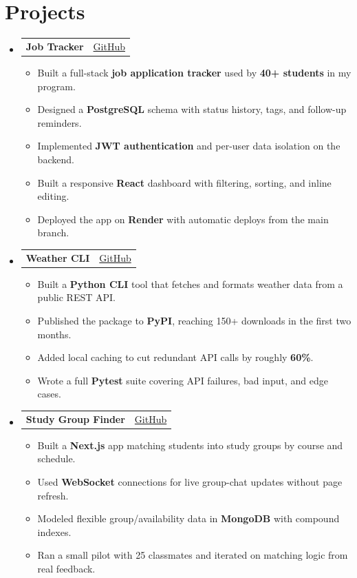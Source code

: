 \documentclass[11pt, a4paper]{article}
\makeatletter
\newcommand{\outerListStart}{%
  \begin{itemize}[
    leftmargin = 0pt,
    label      = {},
    itemsep    = 6pt,
    parsep     = 0pt,
    topsep     = 2pt,
    listparindent = 0pt
  ]%
}
\newcommand{\outerListEnd}{\end{itemize}}
\newcommand{\bulletListStart}{%
  \begin{itemize}[
    leftmargin = 14pt,
    label      = {\small\textbullet},
    itemsep    = 0pt,
    parsep     = 0pt,
    topsep     = 3pt,
    partopsep  = 0pt
  ]%
}
\newcommand{\bulletListEnd}{\end{itemize}}
\newcommand{\bitem}[1]{\item \small #1}
\newcommand{\projectBlockStart}[4]{%
  \item\begin{minipage}[t]{\linewidth}
  \begin{tabularx}{\linewidth}{@{}X r@{}}
    \textbf{#1}\enspace{\small\textit{#2}} &
    {\small\faGithub\enspace\href{#3}{#4}}
  \end{tabularx}\vspace{-1pt}%
}
\newcommand{\projectBlockEnd}{\end{minipage}\vspace{6pt}}
\makeatother
\begin{document}
\section{Projects}

\outerListStart

  \projectBlockStart
    {Job Tracker}
    {\textbar\ Application Tracking Web App \textbar\ React, Node.js, PostgreSQL}
    {https://github.com/alexmorgan/job-tracker}
    {GitHub}
  \bulletListStart
    \bitem{Built a full-stack \textbf{job application tracker} used by \textbf{40+ students} in my program.}
    \bitem{Designed a \textbf{PostgreSQL} schema with status history, tags, and follow-up reminders.}
    \bitem{Implemented \textbf{JWT authentication} and per-user data isolation on the backend.}
    \bitem{Built a responsive \textbf{React} dashboard with filtering, sorting, and inline editing.}
    \bitem{Deployed the app on \textbf{Render} with automatic deploys from the main branch.}
  \bulletListEnd
  \projectBlockEnd

  \projectBlockStart
    {Weather CLI}
    {\textbar\ Command-Line Weather Tool \textbar\ Python, REST API}
    {https://github.com/alexmorgan/weather-cli}
    {GitHub}
  \bulletListStart
    \bitem{Built a \textbf{Python CLI} tool that fetches and formats weather data from a public REST API.}
    \bitem{Published the package to \textbf{PyPI}, reaching 150+ downloads in the first two months.}
    \bitem{Added local caching to cut redundant API calls by roughly \textbf{60\%}.}
    \bitem{Wrote a full \textbf{Pytest} suite covering API failures, bad input, and edge cases.}
  \bulletListEnd
  \projectBlockEnd

  \projectBlockStart
    {Study Group Finder}
    {\textbar\ Real-Time Matching Tool \textbar\ Next.js, MongoDB, WebSocket}
    {https://github.com/alexmorgan/study-finder}
    {GitHub}
  \bulletListStart
    \bitem{Built a \textbf{Next.js} app matching students into study groups by course and schedule.}
    \bitem{Used \textbf{WebSocket} connections for live group-chat updates without page refresh.}
    \bitem{Modeled flexible group/availability data in \textbf{MongoDB} with compound indexes.}
    \bitem{Ran a small pilot with 25 classmates and iterated on matching logic from real feedback.}
  \bulletListEnd
  \projectBlockEnd

\outerListEnd
\end{document}
